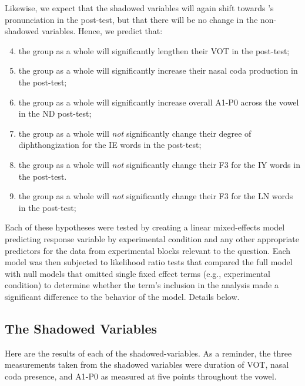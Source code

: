    Likewise, we expect that the shadowed variables will again shift towards \annie{}'s pronunciation in the \ND{} post-test, but that there will be no change in the non-shadowed variables. Hence, we predict that:
    \begin{enumerate}
        \setcounter{enumi}{3}
        \item the group as a whole will significantly lengthen their VOT in the post-test; \label{hyp:vot_longer_in_post}
        \item the group as a whole will significantly increase their nasal coda production in the post-test; \label{hyp:more_coda_in_post}
        \item the group as a whole will significantly increase overall A1-P0 across the vowel in the ND post-test; \label{hyp:a1p0_higher_in_post}
        \item the group as a whole will \emph{not} significantly change their degree of diphthongization for the IE words in the post-test; \label{hyp:ie_no_change}
        \item the group as a whole will \emph{not} significantly change their F3 for the IY words in the post-test. \label{hyp:iy_no_change}
        \item the group as a whole will \emph{not} significantly change their F3 for the LN words in the post-test; \label{hyp:ln_no_change}
    \end{enumerate}
    
    Each of these hypotheses were tested by creating a linear mixed-effects model predicting response variable by experimental condition and any other appropriate predictors for the data from experimental blocks relevant to the question. Each model was then subjected to likelihood ratio tests that compared the full model with null models that omitted single fixed effect terms (e.g., experimental condition) to determine whether the term's inclusion in the analysis made a significant difference to the behavior of the model. Details %
    below.

\subsection{The Shadowed Variables}
\label{ssec:votnasResults}
    Here are the results of each of the shadowed-variables. As a reminder, the three measurements taken from the shadowed variables were duration of VOT, nasal coda presence, and A1-P0 as measured at five points throughout the vowel.
    
